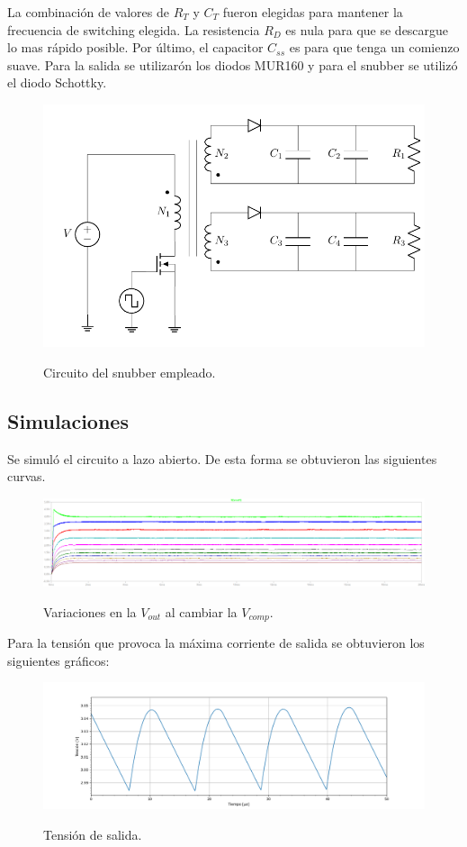 La combinación de valores de $R_T$ y $C_T$ fueron elegidas para mantener la frecuencia de switching elegida. La resistencia $R_D$ es nula para que se descargue lo mas rápido posible. Por último, el capacitor $C_{ss}$ es para que tenga un comienzo suave.
Para la salida se utilizarón los diodos MUR160 y para el snubber se utilizó el diodo Schottky.  
\begin{figure}[H]
	\centering
	\includegraphics[width=0.7\linewidth, page = 1]{ImagenesParteII/Flyback.pdf}
	\label{fig:fly}
	\caption{Circuito del snubber empleado.}
\end{figure}

\subsection{Simulaciones}

Se simuló el circuito a lazo abierto. De esta forma se obtuvieron las siguientes curvas.
\begin{figure}[H]
	\centering
	\includegraphics[width=0.9\linewidth]{ImagenesParteII/vos.png}
	\label{fig:vos}
	\caption{Variaciones en la $V_{out}$ al cambiar la $V_{comp}$.}
\end{figure}

Para la tensión que provoca la máxima corriente de salida se obtuvieron los siguientes gráficos:
\begin{figure}[H]
	\centering
	\includegraphics[width=\linewidth]{ImagenesParteII/ Vo.png}
	\label{fig:vo}
	\caption{Tensión de salida.}
\end{figure}

